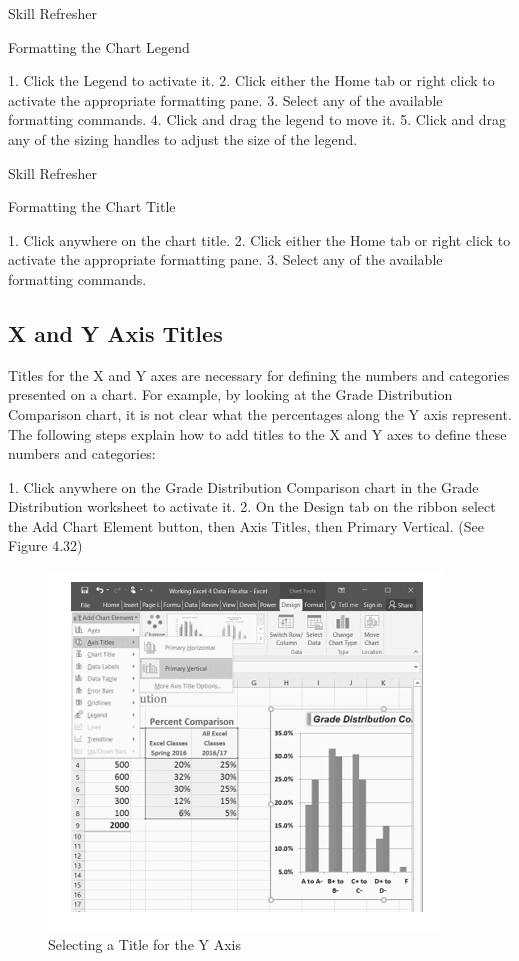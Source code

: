 Skill Refresher


Formatting the Chart Legend

1. Click the Legend to activate it.
2. Click either the Home tab or right click to activate the appropriate formatting pane.
3. Select any of the available formatting commands.
4. Click and drag the legend to move it.
5. Click and drag any of the sizing handles to adjust the size of the legend.




Skill Refresher


Formatting the Chart Title





1. Click anywhere on the chart title.
2. Click either the Home tab or right click to activate the appropriate formatting pane.
3. Select any of the available formatting commands.



\subsection{X and Y Axis Titles}

Titles for the X and Y axes are necessary for defining the numbers and categories presented on a
chart. For example, by looking at the Grade Distribution Comparison chart, it is not clear what the
percentages along the Y axis represent. The following steps explain how to add titles to the X and Y
axes to define these numbers and categories:

1. Click anywhere on the Grade Distribution Comparison chart in the Grade Distribution
worksheet to activate it.
2. On the Design tab on the ribbon select the Add Chart Element button, then Axis Titles, then
Primary Vertical. (See Figure 4.32)


\begin{figure}[H]
	\centering
	\includegraphics[width=\maxwidth{.95\linewidth}]{gfx/ch04_fig35}
	\caption{Selecting a Title for the Y Axis}
	\label{04:fig35}
\end{figure}

